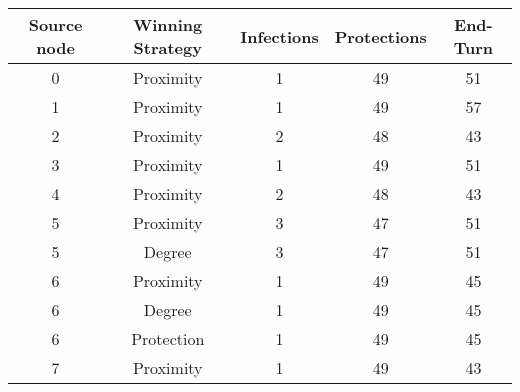 \documentclass[results.tex]{subfiles}
\begin{document}
    \begin{center}
        \begin{tabular}{| c || c | c | c | c |}
            \hline
            {\bfseries Source node} & {\bfseries Winning Strategy} & {\bfseries Infections} & {\bfseries Protections}
            & {\bfseries End-Turn}
            \\  %
            \hline\hline
            0                       & Proximity                    & 1                      & 49                      & 51                   \\
            \hline
            1                       & Proximity                    & 1                      & 49                      & 57                   \\
            \hline
            2                       & Proximity                    & 2                      & 48                      & 43                   \\
            \hline
            3                       & Proximity                    & 1                      & 49                      & 51                   \\
            \hline
            4                       & Proximity                    & 2                      & 48                      & 43                   \\
            \hline
            5                       & Proximity                    & 3                      & 47                      & 51                   \\
            \hline
            5                       & Degree                       & 3                      & 47                      & 51                   \\
            \hline
            6                       & Proximity                    & 1                      & 49                      & 45                   \\
            \hline
            6                       & Degree                       & 1                      & 49                      & 45                   \\
            \hline
            6                       & Protection                   & 1                      & 49                      & 45                   \\
            \hline
            7                       & Proximity                    & 1                      & 49                      & 43                   \\

\end{tabular}
\end{center}
\end{document}
